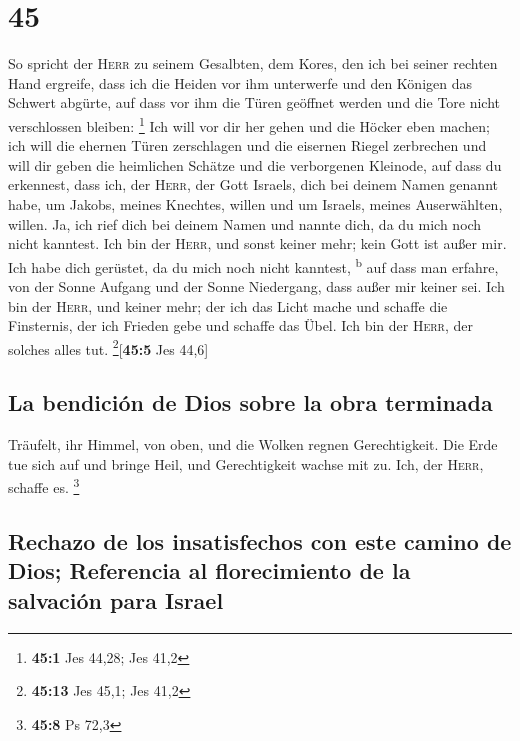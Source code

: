 \hypertarget{section-44}{%
\section{45}\label{section-44}}

 So spricht der \textsc{Herr} zu seinem Gesalbten, dem
Kores, den ich bei seiner rechten Hand ergreife, dass ich die Heiden vor
ihm unterwerfe und den Königen das Schwert abgürte, auf dass vor ihm die
Türen geöffnet werden und die Tore nicht verschlossen bleiben:
\footnote{\textbf{45:1} Jes 44,28; Jes 41,2}  Ich will vor
dir her gehen und die Höcker eben machen; ich will die ehernen Türen
zerschlagen und die eisernen Riegel zerbrechen  und will
dir geben die heimlichen Schätze und die verborgenen Kleinode, auf dass
du erkennest, dass ich, der \textsc{Herr}, der Gott Israels, dich bei
deinem Namen genannt habe,  um Jakobs, meines Knechtes,
willen und um Israels, meines Auserwählten, willen. Ja, ich rief dich
bei deinem Namen und nannte dich, da du mich noch nicht kanntest.
 Ich bin der \textsc{Herr}, und sonst keiner mehr; kein
Gott ist außer mir. Ich habe dich gerüstet, da du mich noch nicht
kanntest, \textsuperscript{b}  auf dass man erfahre, von
der Sonne Aufgang und der Sonne Niedergang, dass außer mir keiner sei.
Ich bin der \textsc{Herr}, und keiner mehr;  der ich das
Licht mache und schaffe die Finsternis, der ich Frieden gebe und schaffe
das Übel. Ich bin der \textsc{Herr}, der solches alles tut.
\footnote{\textbf{45:13} Jes 45,1; Jes 41,2}{[}\textbf{45:5} Jes 44,6{]}

\hypertarget{la-bendiciuxf3n-de-dios-sobre-la-obra-terminada}{%
\subsection{La bendición de Dios sobre la obra
terminada}\label{la-bendiciuxf3n-de-dios-sobre-la-obra-terminada}}

 Träufelt, ihr Himmel, von oben, und die Wolken regnen
Gerechtigkeit. Die Erde tue sich auf und bringe Heil, und Gerechtigkeit
wachse mit zu. Ich, der \textsc{Herr}, schaffe es. \footnote{\textbf{45:8}
  Ps 72,3}

\hypertarget{rechazo-de-los-insatisfechos-con-este-camino-de-dios-referencia-al-florecimiento-de-la-salvaciuxf3n-para-israel}{%
\subsection{Rechazo de los insatisfechos con este camino de Dios;
Referencia al florecimiento de la salvación para
Israel}\label{rechazo-de-los-insatisfechos-con-este-camino-de-dios-referencia-al-florecimiento-de-la-salvaciuxf3n-para-israel}}

